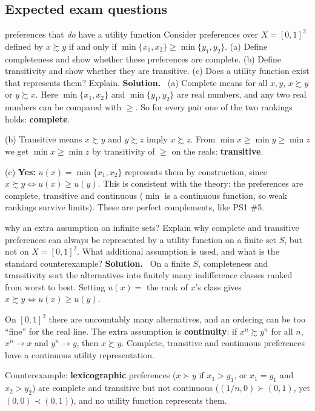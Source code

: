 \documentclass[11pt]{article}
\newcommand{\soln}{\tcblower\textbf{Solution.}\ }
\begin{document}
\subsection*{Expected exam questions}
\begin{examq}{preferences that \emph{do} have a utility function}
Consider preferences over $X=[0,1]^2$ defined by $x\succsim y$ if and only if $\min\{x_1,x_2\}\ge\min\{y_1,y_2\}$.
(a) Define completeness and show whether these preferences are complete.
(b) Define transitivity and show whether they are transitive.
(c) Does a utility function exist that represents them? Explain.
\soln
(a) Complete means for all $x,y$, $x\succsim y$ or $y\succsim x$. Here $\min\{x_1,x_2\}$ and $\min\{y_1,y_2\}$ are real numbers, and any two real numbers can be compared with $\ge$. So for every pair one of the two rankings holds: \textbf{complete}.

(b) Transitive means $x\succsim y$ and $y\succsim z$ imply $x\succsim z$. From $\min x\ge\min y\ge\min z$ we get $\min x\ge\min z$ by transitivity of $\ge$ on the reals: \textbf{transitive}.

(c) \textbf{Yes:} $u(x)=\min\{x_1,x_2\}$ represents them by construction, since $x\succsim y\iff u(x)\ge u(y)$. This is consistent with the theory: the preferences are complete, transitive and continuous ($\min$ is a continuous function, so weak rankings survive limits). These are perfect complements, like PS1 \#5.
\end{examq}

\begin{examq}{why an extra assumption on infinite sets?}
Explain why complete and transitive preferences can always be represented by a utility function on a finite set $S$, but not on $X=[0,1]^2$. What additional assumption is used, and what is the standard counterexample?
\soln
On a finite $S$, completeness and transitivity sort the alternatives into finitely many indifference classes ranked from worst to best. Setting $u(x)=$ the rank of $x$'s class gives $x\succsim y\iff u(x)\ge u(y)$.

On $[0,1]^2$ there are uncountably many alternatives, and an ordering can be too ``fine'' for the real line. The extra assumption is \textbf{continuity}: if $x^n\succsim y^n$ for all $n$, $x^n\to x$ and $y^n\to y$, then $x\succsim y$. Complete, transitive and continuous preferences have a continuous utility representation.

Counterexample: \textbf{lexicographic} preferences ($x\succ y$ if $x_1>y_1$, or $x_1=y_1$ and $x_2>y_2$) are complete and transitive but not continuous ($(1/n,0)\succ(0,1)$, yet $(0,0)\prec(0,1)$), and no utility function represents them.
\end{examq}
\end{document}
